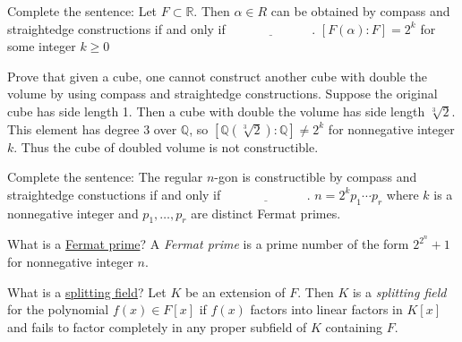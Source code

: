 \documentclass[avery5371,grid]{flashcards}
\newcommand{\R}{\mathbb{R}}
\newcommand{\Q}{\mathbb{Q}}
\newcommand{\blank}{$\; \underline{\hspace{1in}} \; $}
\begin{document}
\begin{flashcard}[Fields]{Complete the sentence: Let $F \subset \R$. Then $\alpha \in R$ can be obtained by compass and straightedge constructions if and only if \blank .}
 $[F(\alpha):F] = 2^k$ for some integer $k \geq 0$
\end{flashcard}

\begin{flashcard}[Fields]{Prove that given a cube, one cannot construct another cube with double the volume by using compass and straightedge constructions.}
 Suppose the original cube has side length 1. Then a cube with double the volume has side length $\sqrt[3]{2}$. This element has degree 3 over $\Q$, so $[\Q(\sqrt[3]{2}):\Q] \neq 2^k$ for nonnegative integer $k$. Thus the cube of doubled volume is not constructible.
\end{flashcard}

\begin{flashcard}[Fields]{Complete the sentence: The regular $n$-gon is constructible by compass and straightedge constuctions if and only if \blank .}
 $n = 2^k p_1 \cdots p_r$ where $k$ is a nonnegative integer and $p_1, \ldots, p_r$ are distinct Fermat primes.
\end{flashcard}

\begin{flashcard}[Fields]{What is a \underline{Fermat prime}?}
 A \emph{Fermat prime} is a prime number of the form $2^{2^n} + 1$ for nonnegative integer $n$.
\end{flashcard}

\begin{flashcard}[Fields]{What is a \underline{splitting field}?}
 Let $K$ be an extension of $F$. Then $K$ is a \emph{splitting field} for the polynomial $f(x) \in F[x]$ if $f(x)$ factors into linear factors in $K[x]$ and fails to factor completely in any proper subfield of $K$ containing $F$.
\end{flashcard}
\end{document}
